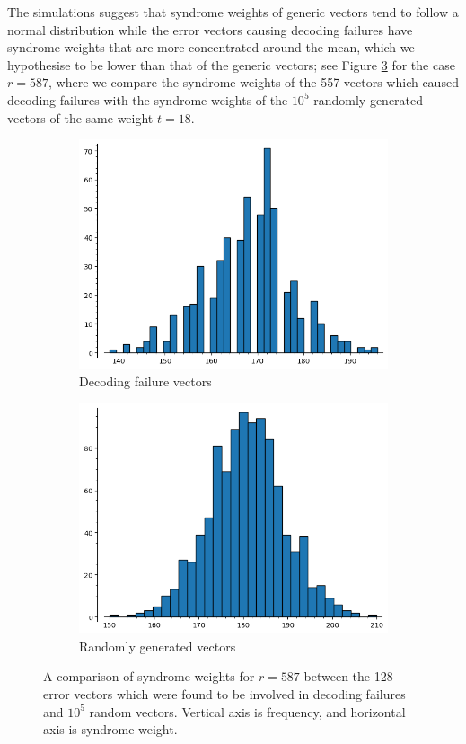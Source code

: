 The simulations suggest that syndrome weights of generic vectors tend to follow a normal distribution while the error vectors causing decoding failures have syndrome weights that are more concentrated around the mean, which we hypothesise to be lower than that of the generic vectors; see Figure \ref{fig:r87_comparison} for the case $r=587$, where we compare the syndrome weights of the 557 vectors which caused decoding failures with the syndrome weights of the $10^5$ randomly generated vectors of the same weight $t = 18$.

\begin{figure}[ht]
\centering
\begin{subfigure}[b]{.45\textwidth}
  \centering
  \includegraphics[scale=.45]{2_bike/r587df_new.png}
  \caption{Decoding failure vectors}
  \label{fig:r587df}
\end{subfigure}
\begin{subfigure}[b]{.45\textwidth}
  \centering
  \includegraphics[scale=.45]{2_bike/r587g_new.png}
  \caption{Randomly generated vectors}
  \label{fig:r587g}
\end{subfigure}
\caption{A comparison of syndrome weights for $r = 587$ between the 128 error vectors which were found to be involved in decoding failures and $10^5$ random vectors. Vertical axis is frequency, and horizontal axis is syndrome weight.}
\label{fig:r87_comparison}
\end{figure}

